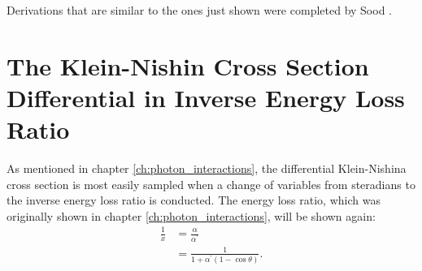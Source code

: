 Derivations that are similar to the ones just shown were completed by Sood
\citep{sood_doppler_2004}. 

\section{The Klein-Nishin Cross Section Differential in Inverse Energy Loss Ratio}
\label{diff_kn_cross_sec_var_change}
As mentioned in chapter \ref{ch:photon_interactions}, the differential 
Klein-Nishina cross section is most easily sampled when a change of variables
from steradians to the inverse energy loss ratio is conducted. The energy loss
ratio, which was originally shown in chapter \ref{ch:photon_interactions}, will
be shown again:
\begin{align}
  \frac{1}{x} & = \frac{\alpha}{\alpha^{'}} \nonumber \\
  & = \frac{1}{1+\alpha^{'}(1-\cos{\theta})}. \nonumber
\end{align}

